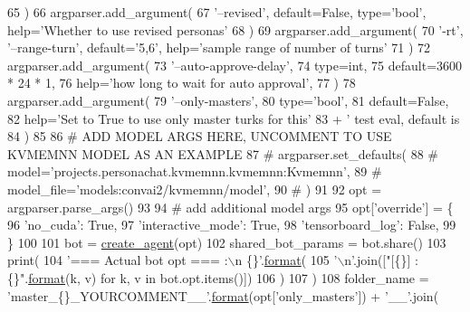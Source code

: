 \begin{DoxyCode}
65     )
66     argparser.add\_argument(
67         \textcolor{stringliteral}{'--revised'}, default=\textcolor{keyword}{False}, type=\textcolor{stringliteral}{'bool'}, help=\textcolor{stringliteral}{'Whether to use revised personas'}
68     )
69     argparser.add\_argument(
70         \textcolor{stringliteral}{'-rt'}, \textcolor{stringliteral}{'--range-turn'}, default=\textcolor{stringliteral}{'5,6'}, help=\textcolor{stringliteral}{'sample range of number of turns'}
71     )
72     argparser.add\_argument(
73         \textcolor{stringliteral}{'--auto-approve-delay'},
74         type=int,
75         default=3600 * 24 * 1,
76         help=\textcolor{stringliteral}{'how long to wait for auto approval'},
77     )
78     argparser.add\_argument(
79         \textcolor{stringliteral}{'--only-masters'},
80         type=\textcolor{stringliteral}{'bool'},
81         default=\textcolor{keyword}{False},
82         help=\textcolor{stringliteral}{'Set to True to use only master turks for this'}
83         + \textcolor{stringliteral}{' test eval, default is %
84     )
85 
86     \textcolor{comment}{# ADD MODEL ARGS HERE, UNCOMMENT TO USE KVMEMNN MODEL AS AN EXAMPLE}
87     \textcolor{comment}{# argparser.set\_defaults(}
88     \textcolor{comment}{#     model='projects.personachat.kvmemnn.kvmemnn:Kvmemnn',}
89     \textcolor{comment}{#     model\_file='models:convai2/kvmemnn/model',}
90     \textcolor{comment}{# )}
91 
92     opt = argparser.parse\_args()
93 
94     \textcolor{comment}{# add additional model args}
95     opt[\textcolor{stringliteral}{'override'}] = \{
96         \textcolor{stringliteral}{'no\_cuda'}: \textcolor{keyword}{True},
97         \textcolor{stringliteral}{'interactive\_mode'}: \textcolor{keyword}{True},
98         \textcolor{stringliteral}{'tensorboard\_log'}: \textcolor{keyword}{False},
99     \}
100 
101     bot = \hyperlink{namespaceparlai_1_1core_1_1agents_a00d77a7e26fb89e8bd900f7b2a02982a}{create\_agent}(opt)
102     shared\_bot\_params = bot.share()
103     print(
104         \textcolor{stringliteral}{'=== Actual bot opt === :\(\backslash\)n \{\}'}.\hyperlink{namespaceparlai_1_1chat__service_1_1services_1_1messenger_1_1shared__utils_a32e2e2022b824fbaf80c747160b52a76}{format}(
105             \textcolor{stringliteral}{'\(\backslash\)n'}.join([\textcolor{stringliteral}{"[\{\}] : \{\}"}.\hyperlink{namespaceparlai_1_1chat__service_1_1services_1_1messenger_1_1shared__utils_a32e2e2022b824fbaf80c747160b52a76}{format}(k, v) \textcolor{keywordflow}{for} k, v \textcolor{keywordflow}{in} bot.opt.items()])
106         )
107     )
108     folder\_name = \textcolor{stringliteral}{'master\_\{\}\_YOURCOMMENT\_\_'}.\hyperlink{namespaceparlai_1_1chat__service_1_1services_1_1messenger_1_1shared__utils_a32e2e2022b824fbaf80c747160b52a76}{format}(opt[\textcolor{stringliteral}{'only\_masters'}]) + \textcolor{stringliteral}{'\_\_'}.join(
}
\end{DoxyCode}
